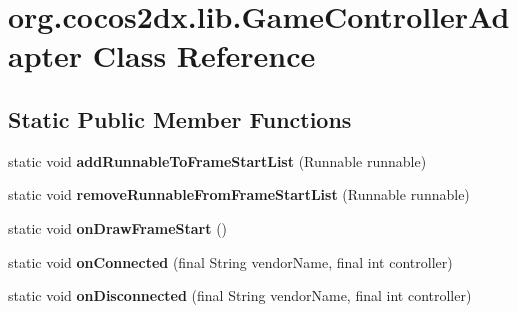 \hypertarget{classorg_1_1cocos2dx_1_1lib_1_1GameControllerAdapter}{}\section{org.\+cocos2dx.\+lib.\+Game\+Controller\+Adapter Class Reference}
\label{classorg_1_1cocos2dx_1_1lib_1_1GameControllerAdapter}
\subsection*{Static Public Member Functions}
\begin{DoxyCompactItemize}
\item 
\mbox{\label{classorg_1_1cocos2dx_1_1lib_1_1GameControllerAdapter_a161d2845919a0163cf356fe1bd0cd589}} 
static void {\bfseries add\+Runnable\+To\+Frame\+Start\+List} (Runnable runnable)
\item 
\mbox{\label{classorg_1_1cocos2dx_1_1lib_1_1GameControllerAdapter_af941367690ffab383e861fb48315af99}} 
static void {\bfseries remove\+Runnable\+From\+Frame\+Start\+List} (Runnable runnable)
\item 
\mbox{\label{classorg_1_1cocos2dx_1_1lib_1_1GameControllerAdapter_a0d67cb470b312edb4cf810fa95598868}} 
static void {\bfseries on\+Draw\+Frame\+Start} ()
\item 
\mbox{\label{classorg_1_1cocos2dx_1_1lib_1_1GameControllerAdapter_a81b2b82d0351f1016757ef805f04e2e0}} 
static void {\bfseries on\+Connected} (final String vendor\+Name, final int controller)
\item 
\mbox{\label{classorg_1_1cocos2dx_1_1lib_1_1GameControllerAdapter_ab8ee1c9fa51e90ef73db325940616961}} 
static void {\bfseries on\+Disconnected} (final String vendor\+Name, final int controller)
\item 
\mbox{\label{classorg_1_1cocos2dx_1_1lib_1_1GameControllerAdapter_a0ee6f49890f00c573d60fc0193b86690}} 

\end{DoxyCompactItemize}
